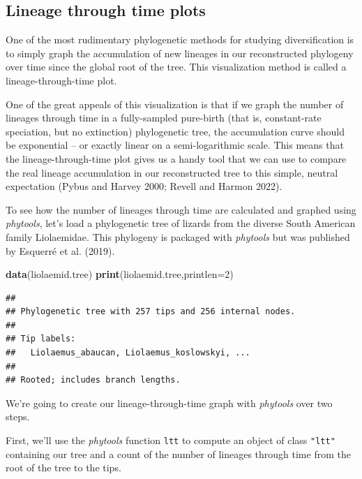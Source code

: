 \documentclass[fleqn,10pt,lineno]{wlpeerj} %
\newenvironment{Shaded}{\begin{snugshade}}{\end{snugshade}}
\newcommand{\AttributeTok}[1]{\textcolor[rgb]{0.13,0.29,0.53}{#1}}
\newcommand{\DecValTok}[1]{\textcolor[rgb]{0.00,0.00,0.81}{#1}}
\newcommand{\FunctionTok}[1]{\textcolor[rgb]{0.13,0.29,0.53}{\textbf{#1}}}
\newcommand{\NormalTok}[1]{#1}
\begin{document}
\hypertarget{lineage-through-time-plots}{%
\subsection{Lineage through time plots}\label{lineage-through-time-plots}}

One of the most rudimentary phylogenetic methods for studying diversification is to simply graph the accumulation of new lineages in our reconstructed phylogeny over time since the global root of the tree. This visualization method is called a lineage-through-time plot.

One of the great appeals of this visualization is that if we graph the number of lineages through time in a fully-sampled pure-birth (that is, constant-rate speciation, but no extinction) phylogenetic tree, the accumulation curve should be exponential -- or exactly linear on a semi-logarithmic scale. This means that the lineage-through-time plot gives us a handy tool that we can use to compare the real lineage accumulation in our reconstructed tree to this simple, neutral expectation (Pybus and Harvey 2000; Revell and Harmon 2022).

To see how the number of lineages through time are calculated and graphed using \emph{phytools}, let's load a phylogenetic tree of lizards from the diverse South American family Liolaemidae. This phylogeny is packaged with \emph{phytools} but was published by Esquerré et al. (2019).

\begin{Shaded}
\begin{Highlighting}[]
\FunctionTok{data}\NormalTok{(liolaemid.tree)}
\FunctionTok{print}\NormalTok{(liolaemid.tree,}\AttributeTok{printlen=}\DecValTok{2}\NormalTok{)}
\end{Highlighting}
\end{Shaded}

\begin{verbatim}
## 
## Phylogenetic tree with 257 tips and 256 internal nodes.
## 
## Tip labels:
##   Liolaemus_abaucan, Liolaemus_koslowskyi, ...
## 
## Rooted; includes branch lengths.
\end{verbatim}

We're going to create our lineage-through-time graph with \emph{phytools} over two steps.

First, we'll use the \emph{phytools} function \texttt{ltt} to compute an object of class \texttt{"ltt"} containing our tree and a count of the number of lineages through time from the root of the tree to the tips.
\end{document}
